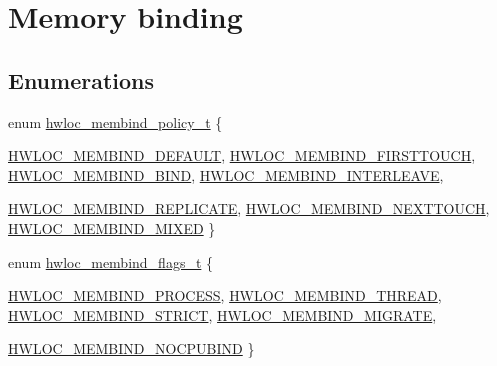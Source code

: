 \hypertarget{a00050}{
\section{Memory binding}
\label{a00050}
}
\subsection*{Enumerations}
\begin{DoxyCompactItemize}
\item 
enum \hyperlink{a00050_gac9764f79505775d06407b40f5e4661e8}{hwloc\_\-membind\_\-policy\_\-t} \{ \par
\hyperlink{a00050_ggac9764f79505775d06407b40f5e4661e8a18675bb80ebc1bce5b652e9de8f3998c}{HWLOC\_\-MEMBIND\_\-DEFAULT}, 
\hyperlink{a00050_ggac9764f79505775d06407b40f5e4661e8a979c7aa78dd32780858f30f47a72cca0}{HWLOC\_\-MEMBIND\_\-FIRSTTOUCH}, 
\hyperlink{a00050_ggac9764f79505775d06407b40f5e4661e8ad811fa4b2a6002c4d63695a408ffde2c}{HWLOC\_\-MEMBIND\_\-BIND}, 
\hyperlink{a00050_ggac9764f79505775d06407b40f5e4661e8ae370075e5af016d42310f87ea5af236b}{HWLOC\_\-MEMBIND\_\-INTERLEAVE}, 
\par
\hyperlink{a00050_ggac9764f79505775d06407b40f5e4661e8afb37480fe5f4236eb7dd4aef26f691e9}{HWLOC\_\-MEMBIND\_\-REPLICATE}, 
\hyperlink{a00050_ggac9764f79505775d06407b40f5e4661e8aecdd4164d647708fbb51a00d98dbb138}{HWLOC\_\-MEMBIND\_\-NEXTTOUCH}, 
\hyperlink{a00050_ggac9764f79505775d06407b40f5e4661e8a3185bd869b67817fb2bd5164bf360402}{HWLOC\_\-MEMBIND\_\-MIXED}
 \}
\item 
enum \hyperlink{a00050_gab00475fd98815bf4fb9aaf752030e7d2}{hwloc\_\-membind\_\-flags\_\-t} \{ \par
\hyperlink{a00050_ggab00475fd98815bf4fb9aaf752030e7d2a1b1b74aef138f64aff214a8cbdfe8eb4}{HWLOC\_\-MEMBIND\_\-PROCESS}, 
\hyperlink{a00050_ggab00475fd98815bf4fb9aaf752030e7d2a1dc7dd5cdcd5796893a325a524555298}{HWLOC\_\-MEMBIND\_\-THREAD}, 
\hyperlink{a00050_ggab00475fd98815bf4fb9aaf752030e7d2a0335311a0ee04166df2888d52b4a42c6}{HWLOC\_\-MEMBIND\_\-STRICT}, 
\hyperlink{a00050_ggab00475fd98815bf4fb9aaf752030e7d2aa6e49e54f52827cb143cc869cfd748af}{HWLOC\_\-MEMBIND\_\-MIGRATE}, 
\par
\hyperlink{a00050_ggab00475fd98815bf4fb9aaf752030e7d2aad6b9eaf2ee324ca58dc8f58094b9997}{HWLOC\_\-MEMBIND\_\-NOCPUBIND}
 \}
\end{DoxyCompactItemize}
